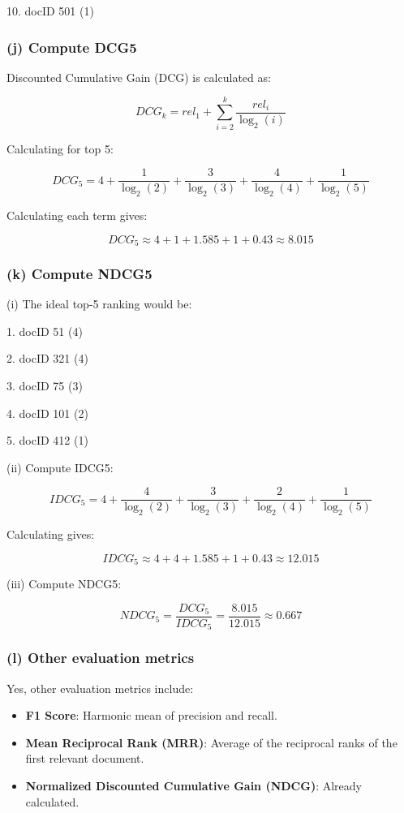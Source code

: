 \documentclass[a4paper, utf8]{ctexart}
\begin{document}
	10. docID 501 (1)  
	
	\subsubsection*{(j) Compute DCG5}
	
	Discounted Cumulative Gain (DCG) is calculated as:
	
	\[
	DCG_k = rel_1 + \sum_{i=2}^k \frac{rel_i}{\log_2(i)}
	\]
	
	Calculating for top 5:
	
	\[
	DCG_5 = 4 + \frac{1}{\log_2(2)} + \frac{3}{\log_2(3)} + \frac{4}{\log_2(4)} + \frac{1}{\log_2(5)}
	\]
	
	Calculating each term gives:
	
	\[
	DCG_5 \approx 4 + 1 + 1.585 + 1 + 0.43 \approx 8.015
	\]
	
	\subsubsection*{(k) Compute NDCG5}
	
	(i) The ideal top-5 ranking would be:
	
	1. docID 51 (4)  
	
	2. docID 321 (4)  
	
	3. docID 75 (3)  
	
	4. docID 101 (2)  
	
	5. docID 412 (1)  
	
	(ii) Compute IDCG5:
	
	\[
	IDCG_5 = 4 + \frac{4}{\log_2(2)} + \frac{3}{\log_2(3)} + \frac{2}{\log_2(4)} + \frac{1}{\log_2(5)}
	\]
	
	Calculating gives:
	
	\[
	IDCG_5 \approx 4 + 4 + 1.585 + 1 + 0.43 \approx 12.015
	\]
	
	(iii) Compute NDCG5:
	
	\[
	NDCG_5 = \frac{DCG_5}{IDCG_5} = \frac{8.015}{12.015} \approx 0.667
	\]
	
	\subsubsection*{(l) Other evaluation metrics}
	
	Yes, other evaluation metrics include:
	
	\begin{itemize}[itemsep=2pt, topsep=0pt, parsep=0pt]
	\item \textbf{F1 Score}: Harmonic mean of precision and recall.
	\item \textbf{Mean Reciprocal Rank (MRR)}: Average of the reciprocal ranks of the first relevant document.
	\item \textbf{Normalized Discounted Cumulative Gain (NDCG)}: Already calculated.
	\end{itemize}
	
\end{document}
